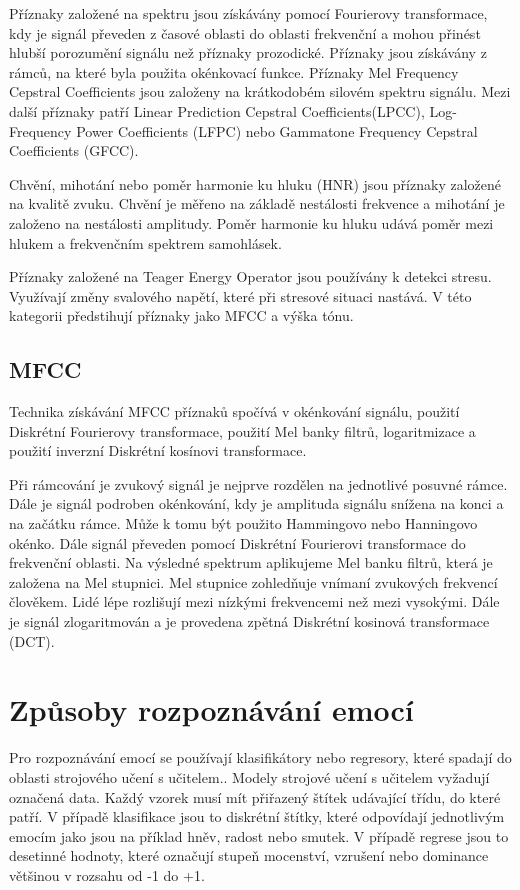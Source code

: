 \documentclass[FM,BP]{tulthesis}
\begin{document}
Příznaky založené na spektru jsou získávány pomocí Fourierovy transformace, kdy je signál převeden z časové oblasti do oblasti frekvenční a mohou přinést hlubší porozumění signálu než příznaky prozodické. Příznaky jsou získávány z rámců, na které byla použita okénkovací funkce. Příznaky Mel Frequency Cepstral Coefficients jsou založeny na krátkodobém silovém spektru signálu. Mezi další příznaky patří Linear Prediction Cepstral Coefficients(LPCC), Log-Frequency Power Coefficients (LFPC) nebo Gammatone Frequency Cepstral Coefficients (GFCC)\cite{DBLP:journals/speech/AkcayO20}.

Chvění, mihotání nebo poměr harmonie ku hluku (HNR) jsou příznaky založené na kvalitě zvuku. Chvění je měřeno na základě nestálosti frekvence a mihotání je založeno na nestálosti amplitudy. Poměr harmonie ku hluku udává poměr mezi hlukem a frekvenčním spektrem samohlásek\cite{DBLP:journals/speech/AkcayO20}.

Příznaky založené na Teager Energy Operator jsou používány k detekci stresu. Využívají změny svalového napětí, které při stresové situaci nastává. V této kategorii předstihují příznaky jako MFCC a výška tónu.

\subsection{MFCC}
Technika získávání MFCC příznaků spočívá v okénkování signálu, použití Diskrétní Fourierovy transformace, použití Mel banky filtrů, logaritmizace a použití inverzní Diskrétní kosínovi transformace. 

Při rámcování je zvukový signál je nejprve rozdělen na jednotlivé posuvné rámce. Dále je signál podroben okénkování, kdy je amplituda signálu snížena na konci a na začátku rámce. Může k tomu být použito Hammingovo nebo Hanningovo okénko. Dále signál převeden pomocí Diskrétní Fourierovi transformace do frekvenční oblasti. Na výsledné spektrum aplikujeme Mel banku filtrů, která je založena na Mel stupnici. Mel stupnice zohledňuje vnímaní zvukových frekvencí člověkem. Lidé lépe rozlišují mezi nízkými frekvencemi než mezi vysokými. Dále je signál zlogaritmován a je provedena zpětná Diskrétní kosinová transformace (DCT). \cite{hui_2019}

\section{Způsoby rozpoznávání emocí}
Pro rozpoznávání emocí se používají klasifikátory nebo regresory, které spadají do oblasti strojového učení s učitelem.\cite{DBLP:journals/speech/AkcayO20}. Modely strojové učení s učitelem vyžadují označená data. Každý vzorek musí mít přiřazený štítek udávající třídu, do které patří. V případě klasifikace jsou to diskrétní štítky, které odpovídají jednotlivým emocím jako jsou na příklad hněv, radost nebo smutek. V případě regrese jsou to desetinné hodnoty, které označují stupeň mocenství, vzrušení nebo dominance většinou v rozsahu od -1 do +1\cite{konar_chakraborty_2015}.
\end{document}
